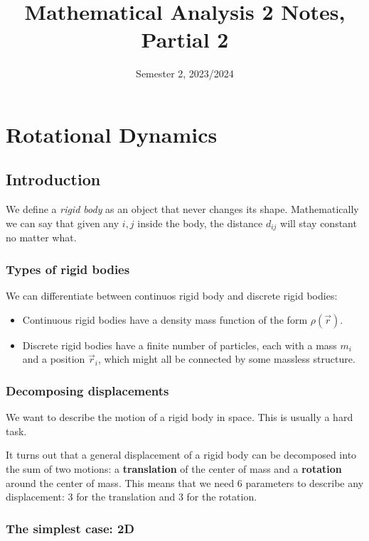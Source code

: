 \documentclass[12pt]{extarticle}
\title{Mathematical Analysis 2 Notes, Partial 2}
\date{Semester 2, 2023/2024}
\begin{document}
\maketitle
\tableofcontents
\clearpage

\section{Rotational Dynamics}

\subsection{Introduction}

We define a \emph{rigid body} as an object that never changes its shape.
Mathematically we can say that given any $i, j$ inside the body, the distance $d_{ij}$ will stay constant no matter what.

\subsubsection{Types of rigid bodies}

We can differentiate between continuos rigid body and discrete rigid bodies:
\begin{itemize}
    \item Continuous rigid bodies have a density mass function of the form $\rho(\vec{r})$.
    \item Discrete rigid bodies have a finite number of particles, each with a mass $m_i$ and a position $\vec{r}_i$, which might all be connected by some massless structure.
\end{itemize}

\subsubsection{Decomposing displacements}

We want to describe the motion of a rigid body in space. This is usually a hard task.

It turns out that a general displacement of a rigid body can be decomposed into the sum of two motions: a \textbf{translation} of the center of mass and a \textbf{rotation} around the center of mass.
This means that we need 6 parameters to describe any displacement: 3 for the translation and 3 for the rotation.

\subsubsection{The simplest case: 2D}
\end{document}

